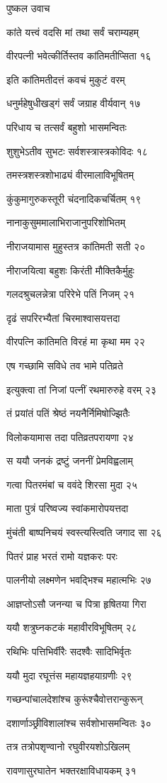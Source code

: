 पुष्कल उवाच

कांते यत्त्वं वदसि मां तथा सर्वं चराम्यहम्

वीरपत्नी भवेत्कीर्तिस्तव कांतिमतीप्सिता १६

इति कांतिमतीदत्तं कवचं मुकुटं वरम्

धनुर्महेषुधीखड्गं सर्वं जग्राह वीर्यवान् १७

परिधाय च तत्सर्वं बहुशो भासमन्वितः

शुशुभेऽतीव सुभटः सर्वशस्त्रास्त्रकोविदः १८

तमस्त्रशस्त्रशोभाढ्यं वीरमालाविभूषितम्

कुंकुमागुरुकस्तूरी चंदनादिकचर्चितम् १९

नानाकुसुममालाभिराजानुपरिशोभितम्

नीराजयामास मुहुस्तत्र कांतिमती सती २०

नीराजयित्वा बहुशः किरंती मौक्तिकैर्मुहुः

गलदश्रुचलन्नेत्रा परिरेभे पतिं निजम् २१

दृढं सपरिरभ्यैतां चिरमाश्वासयत्तदा

वीरपत्नि कांतिमति विरहं मा कृथा मम २२

एष गच्छामि सविधे तव भामे पतिव्रते

इत्युक्त्वा तां निजां पत्नीं रथमारुरुहे वरम् २३

तं प्रयांतं पतिं श्रेष्ठं नयनैर्निमिषोज्झितैः

विलोकयामास तदा पतिव्रतपरायणा २४

स ययौ जनकं द्रष्टुं जननीं प्रेमविह्वलाम्

गत्वा पितरमंबां च ववंदे शिरसा मुदा २५

माता पुत्रं परिष्वज्य स्वांकमारोपयत्तदा

मुंचंती बाष्पनिचयं स्वस्त्यस्त्विति जगाद सा २६

पितरं प्राह भरतं रामो यज्ञकरः परः

पालनीयो लक्ष्मणेन भवद्भिश्च महात्मभिः २७

आज्ञप्तोऽसौ जनन्या च पित्रा हृषितया गिरा

ययौ शत्रुघ्नकटकं महावीरविभूषितम् २८

रथिभिः पत्तिभिर्वीरैः सदश्वैः सादिभिर्वृतः

ययौ मुदा रघूत्तंस महायज्ञहयाग्रणीः २९

गच्छन्पांचालदेशांश्च कुरूंश्चैवोत्तरान्कुरून्

दशार्णाञ्छ्रीविशालांश्च सर्वशोभासमन्वितः ३०

तत्र तत्रोपशृण्वानो रघुवीरयशोऽखिलम्

रावणासुरघातेन भक्तरक्षाविधायकम् ३१

